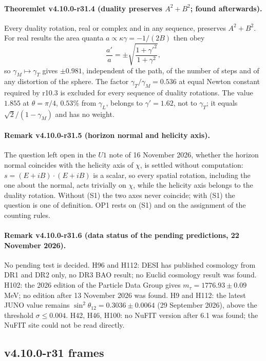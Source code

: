 \paragraph{Theoremlet v4.10.0-r31.4 (duality preserves \(A^2+B^2\); found afterwards).}
Every duality rotation, real or complex and in any sequence, preserves \(A^2+B^2\).  For real results the area quanta
\(a\propto\kappa\gamma=-1/(2B)\) then obey
\[
\frac{a'}{a}=\pm\sqrt{\frac{1+\gamma'^2}{1+\gamma^2}},
\]
so \(\gamma_M\mapsto\gamma_T\) gives \(\pm0.981\), independent of the path, of the number of steps and of any distortion of the sphere.  The
factor \(\gamma_T/\gamma_M=0.536\) at equal Newton constant required by r10.3 is excluded for every sequence of duality rotations.  The
value \(1.855\) at \(\theta=\pi/4\), \(0.53\%\) from \(\gamma_L\), belongs to \(\gamma'=1.62\), not to \(\gamma_T\); it equals \(\sqrt2/(1-\gamma_M)\) and has
no weight.

\paragraph{Remark v4.10.0-r31.5 (horizon normal and helicity axis).}
The question left open in the \(U1\) note of 16 November 2026, whether the horizon normal coincides with the helicity axis of \(\chi\), is
settled without computation: \(s=(E+iB)\cdot(E+iB)\) is a scalar, so every spatial rotation, including the one about the normal, acts
trivially on \(\chi\), while the helicity axis belongs to the duality rotation.  Without (S1) the two axes never coincide; with (S1) the
question is one of definition.  OP1 rests on (S1) and on the assignment of the counting rules.

\paragraph{Remark v4.10.0-r31.6 (data status of the pending predictions, 22 November 2026).}
No pending test is decided.  H96 and H112: DESI has published cosmology from DR1 and DR2 only, no DR3 BAO result; no Euclid cosmology
result was found.  H102: the 2026 edition of the Particle Data Group gives \(m_\tau=1776.93\pm0.09\)\,MeV; no edition after 13 November
2026 was found.  H9 and H112: the latest JUNO value remains \(\sin^2\theta_{12}=0.3036\pm0.0064\) (29 September 2026), above the
threshold \(\sigma\le0.004\).  H42, H46, H100: no NuFIT version after 6.1 was found; the NuFIT site could not be read directly.

\subsection*{v4.10.0-r31 frames}
\label{subsec:v4100-r31-frames}

